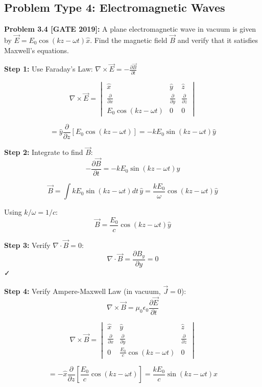 \documentclass[12pt,a4paper]{article}
\begin{document}
\subsection{Problem Type 4: Electromagnetic Waves}

\textbf{Problem 3.4 [GATE 2019]:} A plane electromagnetic wave in vacuum is given by $\vec{E} = E_0\cos(kz - \omega t)\hat{x}$. Find the magnetic field $\vec{B}$ and verify that it satisfies Maxwell's equations.

\begin{solution}
\textbf{Step 1:} Use Faraday's Law: $\nabla \times \vec{E} = -\frac{\partial \vec{B}}{\partial t}$

$$\nabla \times \vec{E} = \begin{vmatrix}
\hat{x} & \hat{y} & \hat{z} \\
\frac{\partial}{\partial x} & \frac{\partial}{\partial y} & \frac{\partial}{\partial z} \\
E_0\cos(kz-\omega t) & 0 & 0
\end{vmatrix}$$

$$= \hat{y}\frac{\partial}{\partial z}[E_0\cos(kz-\omega t)] = -kE_0\sin(kz-\omega t)\hat{y}$$

\textbf{Step 2:} Integrate to find $\vec{B}$:
$$-\frac{\partial \vec{B}}{\partial t} = -kE_0\sin(kz-\omega t)\hat{y}$$

$$\vec{B} = \int kE_0\sin(kz-\omega t)dt\,\hat{y} = \frac{kE_0}{\omega}\cos(kz-\omega t)\hat{y}$$

Using $k/\omega = 1/c$:
$$\vec{B} = \frac{E_0}{c}\cos(kz-\omega t)\hat{y}$$

\textbf{Step 3:} Verify $\nabla \cdot \vec{B} = 0$:
$$\nabla \cdot \vec{B} = \frac{\partial B_y}{\partial y} = 0$$ ✓

\textbf{Step 4:} Verify Ampere-Maxwell Law (in vacuum, $\vec{J} = 0$):
$$\nabla \times \vec{B} = \mu_0\epsilon_0\frac{\partial \vec{E}}{\partial t}$$

$$\nabla \times \vec{B} = \begin{vmatrix}
\hat{x} & \hat{y} & \hat{z} \\
\frac{\partial}{\partial x} & \frac{\partial}{\partial y} & \frac{\partial}{\partial z} \\
0 & \frac{E_0}{c}\cos(kz-\omega t) & 0
\end{vmatrix}$$

$$= -\hat{x}\frac{\partial}{\partial z}\left[\frac{E_0}{c}\cos(kz-\omega t)\right] = \frac{kE_0}{c}\sin(kz-\omega t)\hat{x}$$


\end{solution}
\end{document}
